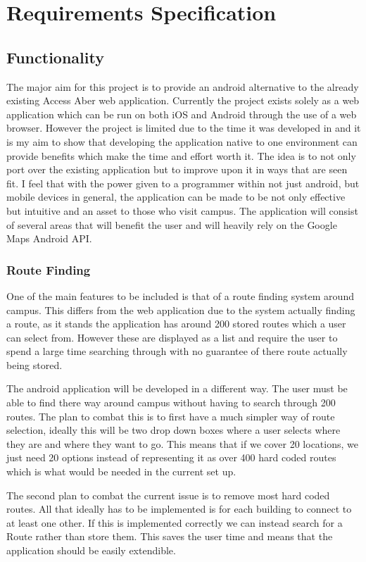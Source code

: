 \chapter{Requirements Specification}

\section{Functionality}

The major aim for this project is to provide an android alternative to the already existing Access Aber web application. Currently the project exists solely as a web application which can be run on both iOS and Android through the use of a web browser. However the project is limited due to the time it was developed in and it is my aim to show that developing the application native to one environment can provide benefits which make the time and effort worth it. The idea is to not only port over the existing application but to improve upon it in ways that are seen fit. I feel that with the power given to a programmer within not just android, but mobile devices in general, the application can be made to be not only effective but intuitive and an asset to those who visit campus. The application will consist of several areas that will benefit the user and will heavily rely on the Google Maps Android API. 
\subsection{Route Finding}
One of the main features to be included is that of a route finding system around campus. This differs from the web application due to the system actually finding a route, as it stands the application has around 200 stored routes which a user can select from. However these are displayed as a list and require the user to spend a large time searching through with no guarantee of there route actually being stored.

The android application will be developed in a different way. The user must be able to find there way around campus without having to search through 200 routes. The plan to combat this is to first have a much simpler way of route selection, ideally this will be two drop down boxes where a user selects where they are and where they want to go. This means that if we cover 20 locations, we just need 20 options instead of representing it as over 400 hard coded routes which is what would be needed in the current set up. 

The second plan to combat the current issue is to remove most hard coded routes. All that ideally has to be implemented is for each building to connect to at least one other. If this is implemented correctly we can instead search for a Route rather than store them. This saves the user time and means that the application should be easily extendible. 


